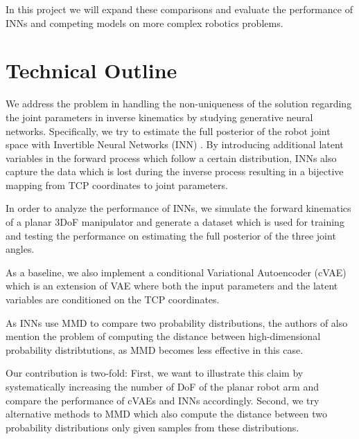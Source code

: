 \documentclass[12pt]{extarticle}
\begin{document}
In this project we will expand these comparisons and evaluate the performance of INNs and competing models on
more complex robotics problems.

\section*{Technical Outline}

We address the problem in handling the non-uniqueness of the solution regarding the joint parameters in inverse kinematics by studying generative neural networks. Specifically, we try to estimate the full posterior of the robot joint space with Invertible Neural Networks (INN) \cite{Ardizzone2018}. By introducing additional latent variables in the forward process which follow a certain distribution, INNs also capture the data which is lost during the inverse process resulting in a bijective mapping from TCP coordinates to joint parameters.

In order to analyze the performance of INNs, we simulate the forward kinematics of a planar 3DoF manipulator and generate a dataset which is used for training and testing the performance on estimating the full posterior of the three joint angles.

As a baseline, we also implement a conditional Variational Autoencoder (cVAE) \cite{Sohn2015} which is an extension of VAE where both the input parameters and the latent variables are conditioned on the TCP coordinates.

As INNs use MMD to compare two probability distributions, the authors of \cite{Ardizzone2018} also mention the problem of computing the distance between high-dimensional probability distribtutions, as MMD becomes less effective in this case.

Our contribution is two-fold: First, we want to illustrate this claim by systematically increasing the number of DoF of the planar robot arm and compare the performance of cVAEs and INNs accordingly. Second, we try alternative methods to MMD which also compute the distance between two probability distributions only given samples from these distributions.



\end{document}

